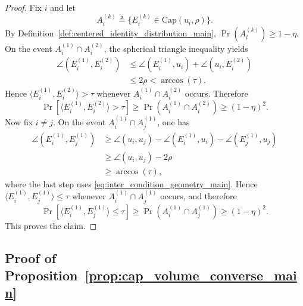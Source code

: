 \documentclass[journal]{IEEEtran}
\begin{document}
\begin{bibunit}
\begin{proof}
%
Fix $i$ and let
%
\begin{equation}
A_i^{(k)}\triangleq \{E_i^{(k)}\in \mathrm{Cap}(u_i,\rho)\}.
\end{equation}
%
By Definition~\ref{def:centered_identity_distribution_main}, $\Pr(A_i^{(k)})\ge 1-\eta$. On the event $A_i^{(1)}\cap A_i^{(2)}$, the spherical triangle inequality yields
%
\begin{align}
\angle(E_i^{(1)},E_i^{(2)})
& \le \angle(E_i^{(1)},u_i)+\angle(u_i,E_i^{(2)})\\
& \le 2\rho < \arccos(\tau).    
\end{align}
%
Hence $\langle E_i^{(1)},E_i^{(2)}\rangle > \tau$ whenever $A_i^{(1)}\cap A_i^{(2)}$ occurs. Therefore
%
\begin{equation}
\Pr \left[\langle E_i^{(1)},E_i^{(2)}\rangle>\tau\right]
\ge \Pr(A_i^{(1)}\cap A_i^{(2)})
\ge (1-\eta)^2.
\end{equation}
%
Now fix $i\neq j$. On the event $A_i^{(1)}\cap A_j^{(1)}$, one has
%
\begin{align}
\angle(E_i^{(1)},E_j^{(1)}) & \ge 
\angle(u_i,u_j)-\angle(E_i^{(1)},u_i)-\angle(E_j^{(1)},u_j) \nonumber\\
& \ge  \angle(u_i,u_j)-2\rho \nonumber\\
& \ge  \arccos(\tau),    
\end{align}
%
where the last step uses \eqref{eq:inter_condition_geometry_main}. Hence $\langle E_i^{(1)},E_j^{(1)}\rangle \le \tau$ whenever $A_i^{(1)}\cap A_j^{(1)}$ occurs, and therefore
%
\begin{equation}
\Pr \left[\langle E_i^{(1)},E_j^{(1)}\rangle\le\tau\right] \ge \Pr(A_i^{(1)}\cap A_j^{(1)})
\ge (1-\eta)^2.
\end{equation}
%
This proves the claim.
%
\end{proof}



\subsection{Proof of Proposition~\ref{prop:cap_volume_converse_main}}
\label{app:proof_prop_cap_volume_converse}


\end{bibunit}
\end{document}
